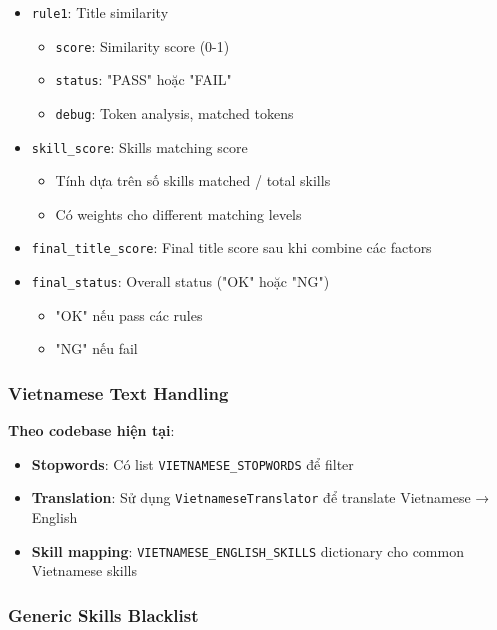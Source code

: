 \begin{itemize}
    \item \texttt{rule1}: Title similarity
    \begin{itemize}
        \item \texttt{score}: Similarity score (0-1)
        \item \texttt{status}: "PASS" hoặc "FAIL"
        \item \texttt{debug}: Token analysis, matched tokens
    \end{itemize}
    
    \item \texttt{skill\_score}: Skills matching score
    \begin{itemize}
        \item Tính dựa trên số skills matched / total skills
        \item Có weights cho different matching levels
    \end{itemize}
    
    \item \texttt{final\_title\_score}: Final title score sau khi combine các factors
    
    \item \texttt{final\_status}: Overall status ("OK" hoặc "NG")
    \begin{itemize}
        \item "OK" nếu pass các rules
        \item "NG" nếu fail
    \end{itemize}
\end{itemize}

\subsubsection{Vietnamese Text Handling}

\textbf{Theo codebase hiện tại}:

\begin{itemize}
    \item \textbf{Stopwords}: Có list \texttt{VIETNAMESE\_STOPWORDS} để filter
    \item \textbf{Translation}: Sử dụng \texttt{VietnameseTranslator} để translate Vietnamese → English
    \item \textbf{Skill mapping}: \texttt{VIETNAMESE\_ENGLISH\_SKILLS} dictionary cho common Vietnamese skills
\end{itemize}

\subsubsection{Generic Skills Blacklist}

